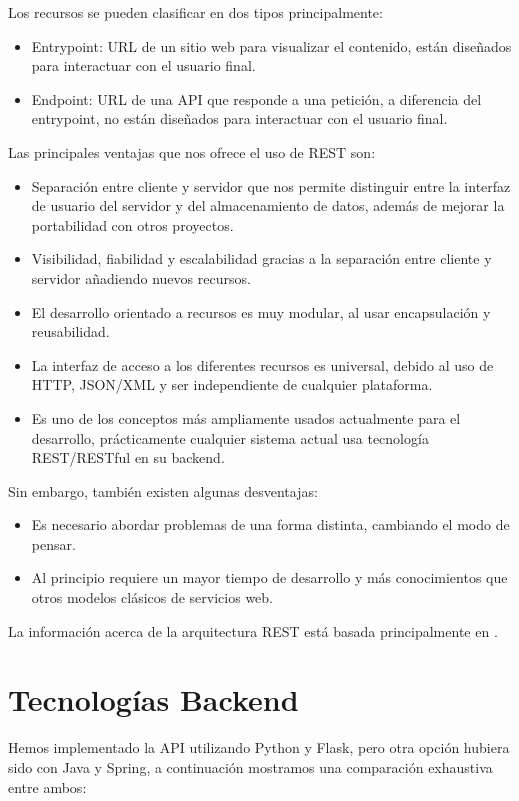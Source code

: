 Los recursos se pueden clasificar en dos tipos principalmente:
\begin{itemize}
	\item Entrypoint: URL de un sitio web para visualizar el contenido, están diseñados para interactuar con el usuario final.
	\item Endpoint: URL de una API que responde a una petición, a diferencia del entrypoint, no están diseñados para interactuar con el usuario final.
\end{itemize}
Las principales ventajas que nos ofrece el uso de REST son:
\begin{itemize}
	\item Separación entre cliente y servidor que nos permite distinguir entre la interfaz de usuario del servidor y del almacenamiento de datos, además de mejorar la portabilidad con otros proyectos.
	\item Visibilidad, fiabilidad y escalabilidad gracias a la separación entre cliente y servidor añadiendo nuevos recursos.
	\item El desarrollo orientado a recursos es muy modular, al usar encapsulación y reusabilidad.
	\item La interfaz de acceso a los diferentes recursos es universal, debido al uso de HTTP, JSON/XML y ser independiente de cualquier plataforma.
	\item Es uno de los conceptos más ampliamente usados actualmente para el desarrollo, prácticamente cualquier sistema actual usa tecnología REST/RESTful en su backend.
\end{itemize}
Sin embargo, también existen algunas desventajas:
\begin{itemize}
	\item Es necesario abordar problemas de una forma distinta, cambiando el modo de pensar.
	\item Al principio requiere un mayor tiempo de desarrollo y más conocimientos que otros modelos clásicos de servicios web.
\end{itemize}

La información acerca de la arquitectura REST está basada principalmente en \cite{restful}.

\section{Tecnologías Backend}
Hemos implementado la API utilizando Python y Flask, pero otra opción hubiera sido con Java y Spring, a continuación mostramos una comparación exhaustiva entre ambos:

